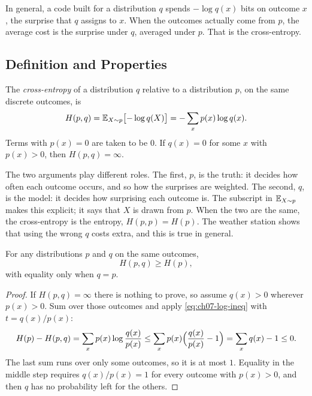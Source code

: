 In general, a code built for a distribution $q$ spends $-\log q(x)$ bits
on outcome $x$, the surprise that $q$ assigns to $x$. When the outcomes
actually come from $p$, the average cost is the surprise under $q$,
averaged under $p$. That is the cross-entropy.

\subsection{Definition and Properties}
\label{sec:ch07-ce-def}

\begin{definition}
  \label{def:cross-entropy}
  The \emph{cross-entropy} of a distribution $q$ relative to a
  distribution $p$, on the same discrete outcomes, is
  \[
    H(p, q) = \mathbb{E}_{X \sim p}\bigl[-\log q(X)\bigr]
    = -\sum_x p(x) \log q(x) .
  \]
  Terms with $p(x) = 0$ are taken to be $0$. If $q(x) = 0$ for some $x$
  with $p(x) > 0$, then $H(p, q) = \infty$.
\end{definition}

The two arguments play different roles. The first, $p$, is the truth:
it decides how often each outcome occurs, and so how the surprises are
weighted. The second, $q$, is the model: it decides how surprising each
outcome is. The subscript in $\mathbb{E}_{X \sim p}$ makes this explicit; it says
that $X$ is drawn from $p$. When the two are the same, the cross-entropy
is the entropy, $H(p, p) = H(p)$. The weather station shows that using
the wrong $q$ costs extra, and this is true in general.

\begin{proposition}
  \label{prop:ch07-gibbs}
  For any distributions $p$ and $q$ on the same outcomes,
  \[
    H(p, q) \ge H(p),
  \]
  with equality only when $q = p$.
\end{proposition}

\begin{proof}
  If $H(p, q) = \infty$ there is nothing to prove, so assume $q(x) > 0$
  wherever $p(x) > 0$. Sum over those outcomes and apply
  \cref{eq:ch07-log-ineq} with $t = q(x)/p(x)$:
  \[
    H(p) - H(p, q) = \sum_x p(x) \log \frac{q(x)}{p(x)}
    \le \sum_x p(x) \Bigl( \frac{q(x)}{p(x)} - 1 \Bigr)
    = \sum_x q(x) - 1 \le 0 .
  \]
  The last sum runs over only some outcomes, so it is at most $1$.
  Equality in the middle step requires $q(x)/p(x) = 1$ for every outcome
  with $p(x) > 0$, and then $q$ has no probability left for the others.
\end{proof}

